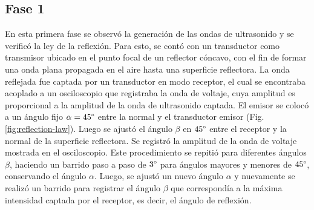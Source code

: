 \documentclass[spanish,notitlepage,letterpaper, 12pt]{article}
\begin{document}
\subsection{Fase 1}
En esta primera fase se observó la generación de las ondas de ultrasonido y
se verificó la ley de la reflexión. Para esto, se contó con un transductor como transmisor
ubicado en el punto focal de un reflector cóncavo, con el fin de formar una onda plana
propagada en el aire hasta una superficie reflectora. La onda reflejada fue captada por un
transductor en modo receptor, el cual se encontraba acoplado a un osciloscopio que registraba la
onda de voltaje, cuya amplitud es proporcional a la amplitud de la onda de ultrasonido
captada. El emisor se colocó a un ángulo fijo $\alpha=45\degree$ entre la normal y el transductor
emisor (Fig. \ref{fig:reflection-law}). Luego se ajustó el ángulo $\beta$ en $45\degree$ entre el receptor y la normal de
la superficie reflectora. Se registró la amplitud de la onda de voltaje mostrada en el
osciloscopio. Este procedimiento se repitió para diferentes ángulos $\beta$,
haciendo un barrido paso a paso de $3\degree$ para ángulos mayores y menores de $45\degree$,
conservando el ángulo $\alpha$. Luego, se ajustó un nuevo ángulo $\alpha$ y nuevamente se realizó
un barrido para registrar el ángulo $\beta$ que correspondía a la máxima intensidad
captada por el receptor, es decir, el ángulo de reflexión.
\end{document}
